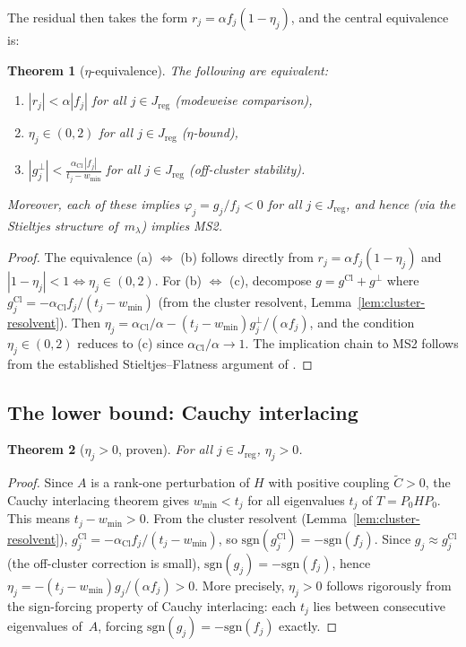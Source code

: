 \documentclass[12pt,a4paper]{article}
\newtheorem{theorem}{Theorem}[section]
\theoremstyle{definition}
\theoremstyle{remark}
\newcommand{\Cl}{\mathrm{Cl}}
\newcommand{\reg}{\mathrm{reg}}
\newcommand{\sgn}{\mathrm{sgn}}
\newcommand{\Ctilde}{\tilde{C}}
\newcommand{\wmin}{w_{\min}}
\begin{document}
The residual then takes the form $r_j = \alpha f_j (1 - \eta_j)$,
and the central equivalence is:

\begin{theorem}[$\eta$-equivalence]
\label{thm:eta-equiv}
The following are equivalent:
\begin{enumerate}[label=(\alph*)]
\item $|r_j| < \alpha |f_j|$ for all $j \in J_{\reg}$
  \hfill (modeweise comparison),
\item $\eta_j \in (0, 2)$ for all $j \in J_{\reg}$
  \hfill ($\eta$-bound),
\item $|g_j^\perp| < \frac{\alpha_{\Cl}\, |f_j|}{t_j - \wmin}$
  for all $j \in J_{\reg}$
  \hfill (off-cluster stability).
\end{enumerate}
Moreover, each of these implies $\varphi_j = g_j / f_j < 0$ for all
$j \in J_{\reg}$, and hence (via the Stieltjes structure of~$m_\lambda$)
implies MS2.
\end{theorem}

\begin{proof}
The equivalence (a) $\Leftrightarrow$ (b) follows directly from
$r_j = \alpha f_j(1 - \eta_j)$ and $|1 - \eta_j| < 1 \Leftrightarrow \eta_j \in (0,2)$.
For (b) $\Leftrightarrow$ (c), decompose $g = g^{\Cl} + g^\perp$ where
$g_j^{\Cl} = -\alpha_{\Cl} f_j / (t_j - \wmin)$
(from the cluster resolvent, Lemma~\ref{lem:cluster-resolvent}).
Then $\eta_j = \alpha_{\Cl}/\alpha - (t_j - \wmin) g_j^\perp / (\alpha f_j)$,
and the condition $\eta_j \in (0,2)$ reduces to (c) since
$\alpha_{\Cl}/\alpha \to 1$.
The implication chain to MS2 follows from the established Stieltjes--Flatness
argument of \cite{Geiger2026partII}.
\end{proof}

\subsection{The lower bound: Cauchy interlacing}

\begin{theorem}[$\eta_j > 0$, proven]
\label{thm:eta-positive}
For all $j \in J_{\reg}$, $\eta_j > 0$.
\end{theorem}

\begin{proof}
Since $A$ is a rank-one perturbation of $H$ with positive coupling
$\Ctilde > 0$, the Cauchy interlacing theorem gives $\wmin < t_j$
for all eigenvalues $t_j$ of $T = P_0 H P_0$.
This means $t_j - \wmin > 0$.
From the cluster resolvent (Lemma~\ref{lem:cluster-resolvent}),
$g_j^{\Cl} = -\alpha_{\Cl} f_j / (t_j - \wmin)$, so
$\sgn(g_j^{\Cl}) = -\sgn(f_j)$.
Since $g_j \approx g_j^{\Cl}$ (the off-cluster correction is small),
$\sgn(g_j) = -\sgn(f_j)$, hence $\eta_j = -(t_j - \wmin)g_j / (\alpha f_j) > 0$.
More precisely, $\eta_j > 0$ follows rigorously from the sign-forcing
property of Cauchy interlacing: each $t_j$ lies between consecutive
eigenvalues of~$A$, forcing $\sgn(g_j) = -\sgn(f_j)$ exactly.
\end{proof}
\end{document}

